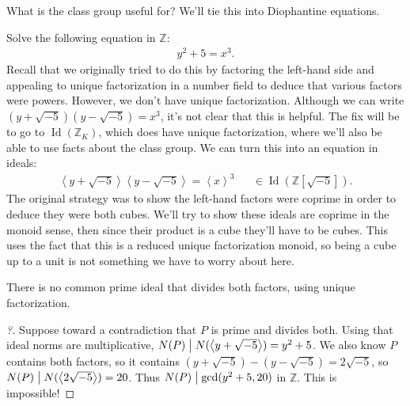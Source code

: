 \begin{remark}

What is the class group useful for? We'll tie this into Diophantine
equations.

\end{remark}

\begin{example}

Solve the following equation in \({\mathbb{Z}}\):
\begin{align*}
y^2 + 5 = x^3
.\end{align*}
Recall that we originally tried to do this by factoring the left-hand
side and appealing to unique factorization in a number field to deduce
that various factors were powers. However, we don't have unique
factorization. Although we can write
\(( y + \sqrt{-5} ) (y - \sqrt{-5} ) = x^3\), it's not clear that this
is helpful. The fix will be to go to
\(\operatorname{Id}({\mathbb{Z}}_K)\), which does have unique
factorization, where we'll also be able to use facts about the class
group. We can turn this into an equation in ideals:
\begin{align*}
\left\langle{ y + \sqrt{-5} }\right\rangle  
\left\langle{ y - \sqrt{-5} }\right\rangle  
= 
\left\langle{ x }\right\rangle^3 && \in \operatorname{Id}({\mathbb{Z}}[\sqrt{-5} ]) 
.\end{align*}
The original strategy was to show the left-hand factors were coprime in
order to deduce they were both cubes. We'll try to show these ideals are
coprime in the monoid sense, then since their product is a cube they'll
have to be cubes. This uses the fact that this is a reduced unique
factorization monoid, so being a cube up to a unit is not something we
have to worry about here.

\begin{claim}

There is no common prime ideal that divides both factors, using unique
factorization.

\end{claim}

\begin{proof}[?]

Suppose toward a contradiction that \(P\) is prime and divides both.
Using that ideal norms are multiplicative,
\(N(P) \bigm|N( \left\langle{ y + \sqrt{-5} }\right\rangle) = y^2 + 5\).
We also know \(P\) contains both factors, so it contains
\((y + \sqrt{-5} ) - (y - \sqrt{-5} ) = 2 \sqrt{-5}\), so
\(N(P) \bigm|N( \left\langle{ 2 \sqrt{-5} }\right\rangle ) = 20\). Thus
\(N(P) \bigm|\gcd(y^2 + 5, 20)\) in \({\mathbb{Z}}\). This is
impossible!


\end{proof}
\end{example}
